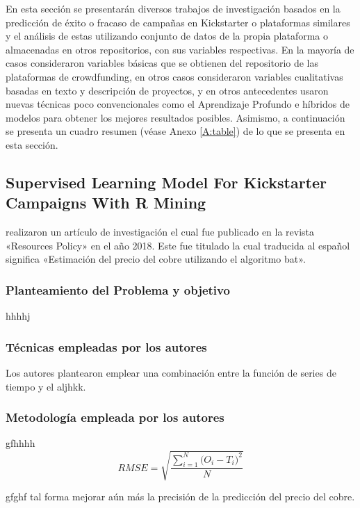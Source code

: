 En esta sección se presentarán diversos trabajos de investigación basados en la predicción de éxito o fracaso de campañas en Kickstarter o plataformas similares y el análisis de estas utilizando conjunto de datos de la propia plataforma o almacenadas en otros repositorios, con sus variables respectivas. En la mayoría de casos consideraron variables básicas que se obtienen del repositorio de las plataformas de crowdfunding, en otros casos consideraron variables cualitativas basadas en texto y descripción de proyectos, y en otros antecedentes usaron nuevas técnicas poco convencionales como el Aprendizaje Profundo e híbridos de modelos para obtener los mejores resultados posibles.
Asimismo, a continuación se presenta un cuadro resumen (véase Anexo \ref{A:table}) de lo que se presenta en esta sección.

\subsection{Supervised Learning Model For Kickstarter Campaigns With R Mining \citep*{pr_kamath2018suplearn}}
\citeauthor{pr_kamath2018suplearn} realizaron un artículo de investigación el cual fue publicado en la revista «Resources Policy» en el año 2018. Este fue titulado  la cual traducida al español significa «Estimación del precio del cobre utilizando el algoritmo bat».

\subsubsection{Planteamiento del Problema y objetivo }
hhhhj

\subsubsection{Técnicas empleadas por los autores}
Los autores plantearon emplear una combinación entre la función de series de tiempo y el aljhkk. 

\subsubsection{Metodología empleada por los autores}
gfhhhh
\begin{equation}  
\label{eq:RMSE}
RMSE = \sqrt{\frac{\sum_{i=1}^{N}{\Big(O_i -T_i\Big)^2}}{N}}
\end{equation}

gfghf tal forma mejorar aún más la precisión de la predicción del precio del cobre.

